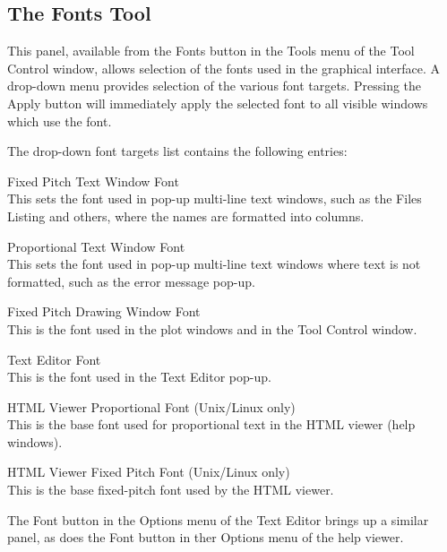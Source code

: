 \subsection{The Fonts Tool}
\label{fontspanel}

This panel, available from the {\cb Fonts} button in the {\cb Tools}
menu of the {\cb Tool Control} window, allows selection of the fonts
used in the graphical interface.  A drop-down menu provides selection
of the various font targets.  Pressing the {\cb Apply} button will
immediately apply the selected font to all visible windows which use
the font.

The drop-down font targets list contains the following entries:

\begin{description}
\item{\cb Fixed Pitch Text Window Font}\\
This sets the font used in pop-up multi-line text windows, such as the
Files Listing and others, where the names are formatted into columns.

\item{\cb Proportional Text Window Font}\\
This sets the font used in pop-up multi-line text windows where text
is not formatted, such as the error message pop-up.

\item{\cb Fixed Pitch Drawing Window Font}\\
This is the font used in the plot windows and in the {\cb Tool
Control} window.

\item{\cb Text Editor Font}\\
This is the font used in the Text Editor pop-up.

\item{{\cb HTML Viewer Proportional Font} (Unix/Linux only)}\\
This is the base font used for proportional text in the HTML viewer
(help windows).

\item{{\cb HTML Viewer Fixed Pitch Font} (Unix/Linux only)}\\
This is the base fixed-pitch font used by the HTML viewer.
\end{description}

The {\cb Font} button in the {\cb Options} menu of the Text Editor
brings up a similar panel, as does the {\cb Font} button in ther {\cb
Options} menu of the help viewer.

